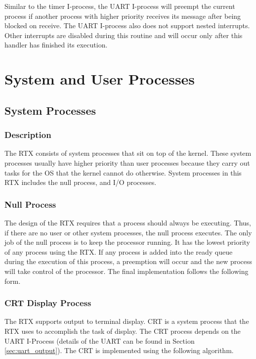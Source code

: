 \documentclass[12pt]{report}
\begin{document}
Similar to the timer I-process, the UART I-process will preempt the current process if another process with higher priority receives its message after being blocked on receive. The UART I-process also does not support nested interrupts. Other interrupts are disabled during this routine and will occur only after this handler has finished its execution.


\chapter{System and User Processes}

\section{System Processes}
\subsection{Description}
The RTX consists of system processes that sit on top of the kernel. These system processes usually have higher priority than user processes because they carry out tasks for the OS that the kernel cannot do otherwise. System processes in this RTX includes the null process, and I/O processes.

\subsection{Null Process}
The design of the RTX requires that a process should always be executing. Thus, if there are no user or other system processes, the null process executes. The only job of the null process is to keep the processor running. It has the lowest priority of any process using the RTX. If any process is added into the ready queue during the execution of this process, a preemption will occur and the new process will take control of the processor. The final implementation follows the following form.

 \begin{algorithmic}
    \EndWhile
  \EndFunction
 \end{algorithmic}

\subsection{CRT Display Process}
\label{sec:crt_process}
The RTX supports output to terminal display. CRT is a system process that the RTX uses to accomplish the task of display. The CRT process depends on the UART I-Process (details of the UART can be found in Section \ref{sec:uart_output}). The CRT is implemented using the following algorithm.
\end{document}
